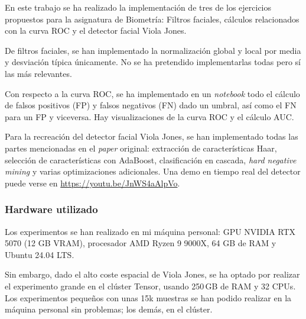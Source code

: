 \documentclass[11pt,spanish,listoffigures,listoftables]{tfgetsinf}
\begin{document}
En este trabajo se ha realizado la implementación de tres de los ejercicios propuestos para la asignatura de Biometría: Filtros faciales, cálculos relacionados con la curva ROC y el detector facial Viola Jones.

De filtros faciales, se han implementado la normalización global y local por media y desviación típica únicamente. No se ha pretendido implementarlas todas pero sí las más relevantes. 

Con respecto a la curva ROC, se ha implementado en un \textit{notebook} todo el cálculo de falsos positivos (FP) y falsos negativos (FN) dado un umbral, así como el FN para un FP y viceversa. Hay visualizaciones de la curva ROC y el cálculo AUC.

Para la recreación del detector facial Viola Jones, se han implementado todas las partes mencionadas en el \textit{paper} original: extracción de características Haar, selección de características con AdaBoost, clasificación en cascada, \textit{hard negative mining} y varias optimizaciones adicionales. Una demo en tiempo real del detector puede verse en \url{https://youtu.be/JnWS4aAlpVo}.


\subsubsection{Hardware utilizado}
Los experimentos se han realizado en mi máquina personal: GPU NVIDIA RTX 5070 (12 GB VRAM), procesador AMD Ryzen 9 9000X, 64 GB de RAM y Ubuntu 24.04 LTS.

Sin embargo, dado el alto coste espacial de Viola Jones, se ha optado por realizar el experimento grande en el clúster Tensor, usando 250\,GB de RAM y 32 CPUs. Los experimentos pequeños con unas 15k muestras se han podido realizar en la máquina personal sin problemas; los demás, en el clúster.
\end{document}
